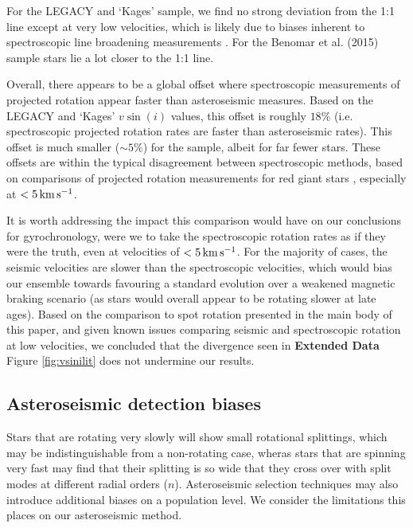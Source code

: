 For the LEGACY and `Kages' sample, we find no strong deviation from the 1:1 line except at very low velocities, which is likely due to biases inherent to spectroscopic line broadening measurements \cite{m_doyle+2014, m_tayar+2015}. For the Benomar et al. (2015) sample stars lie a lot closer to the 1:1 line.

Overall, there appears to be a global offset where spectroscopic measurements of projected rotation appear faster than asteroseismic measures. Based on the LEGACY and `Kages' $v\sin(i)$ values, this offset is roughly $18\%$ (i.e. spectroscopic projected rotation rates are faster than asteroseismic rates). This offset is much smaller ($\sim5\%$) for the \cite{m_benomar+2015} sample, albeit for far fewer stars. These offsets are within the typical disagreement between spectroscopic methods, based on comparisons of projected rotation measurements for red giant stars \cite[see Figure 2]{m_tayar+2015}, especially at $< 5\, \rm{km\,s^{-1}}$.

It is worth addressing the impact this comparison would have on our conclusions for gyrochronology, were we to take the spectroscopic rotation rates as if they were the truth, even at velocities of $< 5\, \rm{km\,s^{-1}}$. For the majority of cases, the seismic velocities are slower than the spectroscopic velocities, which would bias our ensemble towards favouring a standard evolution over a weakened magnetic braking scenario (as stars would overall appear to be rotating slower at late ages). Based on the comparison to spot rotation presented in the main body of this paper, and given known issues comparing seismic and spectroscopic rotation at low velocities, we concluded that the divergence seen in  \textbf{Extended Data} Figure \ref{fig:vsinilit} does not undermine our results.

\subsection{Asteroseismic detection biases}

Stars that are rotating very slowly will show small rotational splittings, which may be indistinguishable from a non-rotating case, wheras stars that are spinning very fast may find that their splitting is so wide that they cross over with split modes at different radial orders ($n$). Asteroseismic selection techniques may also introduce additional biases on a population level. We consider the limitations this places on our asteroseismic method.

